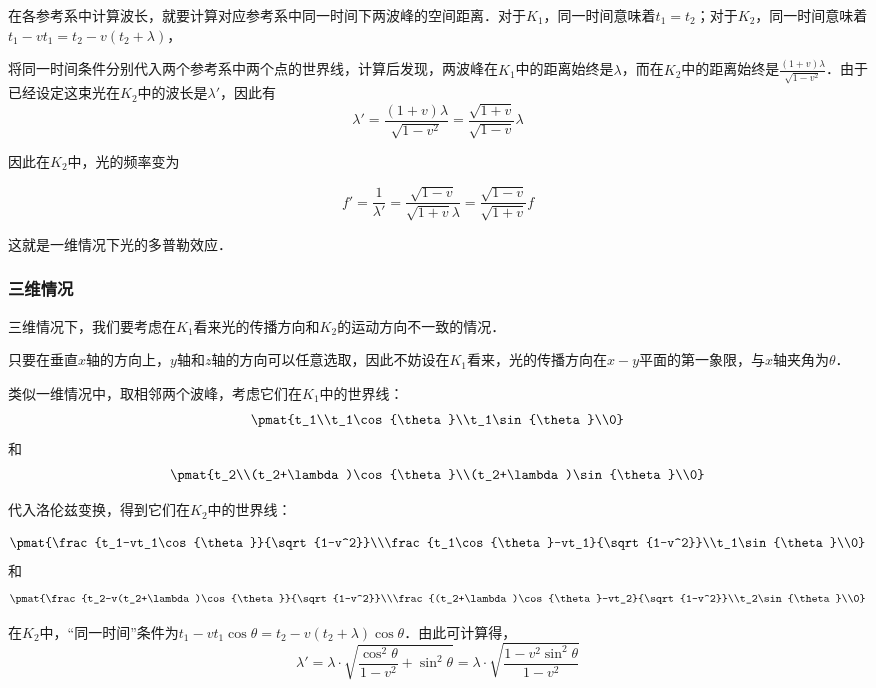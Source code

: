 在各参考系中计算波长，就要计算对应参考系中同一时间下两波峰的空间距离．对于$K_1$，同一时间意味着$t_1=t_2$；对于$K_2$，同一时间意味着$t_1-vt_1=t_2-v(t_2+\lambda)$，

将同一时间条件分别代入两个参考系中两个点的世界线，计算后发现，两波峰在$K_1$中的距离始终是$\lambda$，而在$K_2$中的距离始终是$\frac{(1+v)\lambda}{\sqrt{1-v^2}}$．由于已经设定这束光在$K_2$中的波长是$\lambda'$，因此有
\begin{equation}
\lambda'=\frac{(1+v)\lambda}{\sqrt{1-v^2}}=\frac{\sqrt{1+v}}{\sqrt{1-v}}\lambda
\end{equation}

因此在$K_2$中，光的频率变为

\begin{equation}
f'=\frac{1}{\lambda'}=\frac{\sqrt{1-v}}{\sqrt{1+v}\lambda}=\frac{\sqrt{1-v}}{\sqrt{1+v}}f
\end{equation}

这就是一维情况下光的多普勒效应．

\subsubsection{三维情况}

三维情况下，我们要考虑在$K_1$看来光的传播方向和$K_2$的运动方向不一致的情况．

只要在垂直$x$轴的方向上，$y$轴和$z$轴的方向可以任意选取，因此不妨设在$K_1$看来，光的传播方向在$x-y$平面的第一象限，与$x$轴夹角为$\theta$．

类似一维情况中，取相邻两个波峰，考虑它们在$K_1$中的世界线：
\begin{equation}
\pmat{t_1\\t_1\cos{\theta}\\t_1\sin{\theta}\\0}
\end{equation}
和
\begin{equation}
\pmat{t_2\\(t_2+\lambda)\cos{\theta}\\(t_2+\lambda)\sin{\theta}\\0}
\end{equation}

代入洛伦兹变换，得到它们在$K_2$中的世界线：

\begin{equation}
\pmat{\frac{t_1-vt_1\cos{\theta}}{\sqrt{1-v^2}}\\\frac{t_1\cos{\theta}-vt_1}{\sqrt{1-v^2}}\\t_1\sin{\theta}\\0}
\end{equation}
和
\begin{equation}
\pmat{\frac{t_2-v(t_2+\lambda)\cos{\theta}}{\sqrt{1-v^2}}\\\frac{(t_2+\lambda)\cos{\theta}-vt_2}{\sqrt{1-v^2}}\\t_2\sin{\theta}\\0}
\end{equation}

在$K_2$中，“同一时间”条件为$t_1-vt_1\cos{\theta}=t_2-v(t_2+\lambda)\cos{\theta}$．由此可计算得，
\begin{equation}
\lambda'=\lambda\cdot\sqrt{\frac{\cos^2\theta}{1-v^2}+\sin^2\theta}=\lambda\cdot\sqrt{\frac{1-v^2\sin^2\theta}{1-v^2}}
\end{equation}


